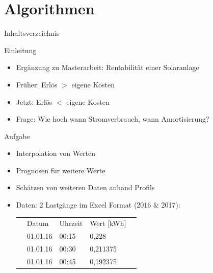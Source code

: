 
\section{Algorithmen}
\begin{frame}{Inhaltsverzeichnis}
\tableofcontents[currentsection]
\end{frame}

\begin{frame}{Einleitung}
	\begin{itemize}
		\item Ergänzung zu Masterarbeit: Rentabilität einer Solaranlage
		\item Früher: Erlös $>$ eigene Kosten
		\item Jetzt: Erlös $<$ eigene Kosten
		\item Frage: Wie hoch wann Stromverbrauch, wann Amortisierung?
	\end{itemize}
\end{frame}

\begin{frame}{Aufgabe}
\begin{itemize}
	\item Interpolation von Werten
	\item Prognosen für weitere Werte
	\item Schätzen von weiteren Daten anhand Profils
	\bigskip
	\item Daten: 2 Lastgänge im Excel Format (2016 \& 2017):
	
\begin{table}[]
	\begin{tabular}{lllll}
		& Datum    & Uhrzeit & Wert [kWh] &  \\
		& 01.01.16 & 00:15   & 0,228      &  \\
		& 01.01.16 & 00:30   & 0,211375   &  \\
		& 01.01.16 & 00:45   & 0,192375   & 
	\end{tabular}
\end{table}
	
\end{itemize}
\end{frame}

